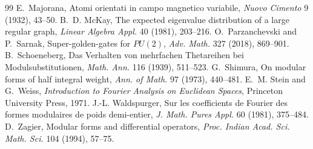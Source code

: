 \documentclass[11pt]{article}
\begin{document}
\begin{thebibliography}{99}
 E.~Majorana, Atomi orientati in campo magnetico variabile, \emph{Nuovo Cimento} 9 (1932), 43--50.
 B.~D. McKay, The expected eigenvalue distribution of a large regular graph, \emph{Linear Algebra Appl.} 40 (1981), 203--216.
 O.~Parzanchevski and P.~Sarnak, Super-golden-gates for $PU(2)$, \emph{Adv. Math.} 327 (2018), 869--901.
 B.~Schoeneberg, Das Verhalten von mehrfachen Thetareihen bei Modulsubstitutionen, \emph{Math. Ann.} 116 (1939), 511--523.
 G.~Shimura, On modular forms of half integral weight, \emph{Ann. of Math.} 97 (1973), 440--481.
 E.~M. Stein and G.~Weiss, \emph{Introduction to Fourier Analysis on Euclidean Spaces}, Princeton University Press, 1971.
 J.-L. Waldspurger, Sur les coefficients de Fourier des formes modulaires de poids demi-entier, \emph{J. Math. Pures Appl.} 60 (1981), 375--484.
 D.~Zagier, Modular forms and differential operators, \emph{Proc. Indian Acad. Sci. Math. Sci.} 104 (1994), 57--75.
\end{thebibliography}
\end{document}
